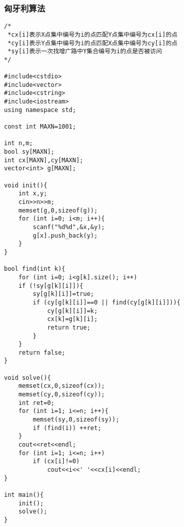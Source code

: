 \subsubsection{匈牙利算法}

\begin{verbatim}
/*
 *cx[i]表示X点集中编号为i的点匹配Y点集中编号为cx[i]的点
 *cy[i]表示Y点集中编号为i的点匹配X点集中编号为cy[i]的点
 *sy[i]表示一次找增广路中Y集合编号为i的点是否被访问
*/

#include<cstdio>
#include<vector>
#include<cstring>
#include<iostream>
using namespace std;

const int MAXN=1001;

int n,m;
bool sy[MAXN];
int cx[MAXN],cy[MAXN];
vector<int> g[MAXN];

void init(){
    int x,y;
    cin>>n>>m;
    memset(g,0,sizeof(g));
    for (int i=0; i<m; i++){
        scanf("%d%d",&x,&y);
        g[x].push_back(y);
    }
}

bool find(int k){
    for (int i=0; i<g[k].size(); i++)
    if (!sy[g[k][i]]){
        sy[g[k][i]]=true;
        if (cy[g[k][i]]==0 || find(cy[g[k][i]])){
            cy[g[k][i]]=k;
            cx[k]=g[k][i];
            return true;
        }
    }
    return false;
}

void solve(){
    memset(cx,0,sizeof(cx));
    memset(cy,0,sizeof(cy));
    int ret=0;
    for (int i=1; i<=n; i++){
        memset(sy,0,sizeof(sy));
        if (find(i)) ++ret;
    }
    cout<<ret<<endl;
    for (int i=1; i<=n; i++)
        if (cx[i]!=0)
            cout<<i<<' '<<cx[i]<<endl;
}

int main(){
    init();
    solve();
}
\end{verbatim}
